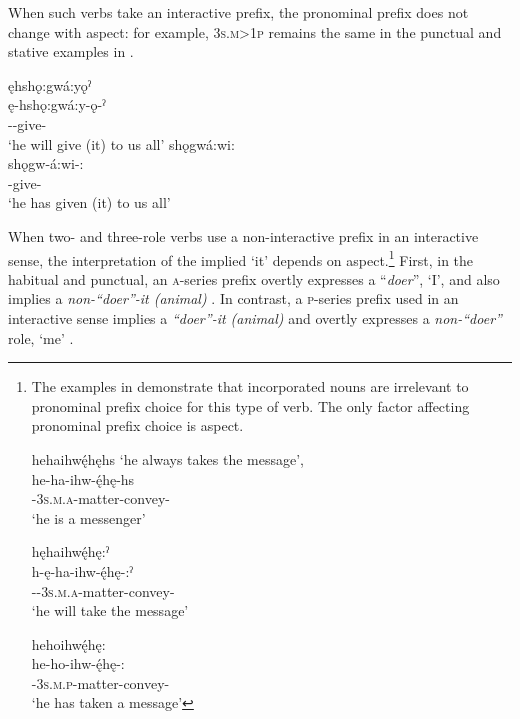When such verbs take an interactive prefix, the pronominal prefix does not change with aspect: for example,  \textsc{3s.m>1p} remains the same in the punctual and stative examples in .

\ea\label{ex:3aspswitex7}
\ea ęhshǫ:gwá:yǫˀ\\
\gll ę-hshǫ:gwá:y-ǫ-ˀ\\
 \fut--give-{\punctual}\\
\glt `he will give (it) to us all'
\ex shǫgwá:wi:\\
\gll shǫgw-á:wi-:\\
 -give-{\stative}\\
\glt `he has given (it) to us all'
\z
\z

When two- and three-role verbs use a non-interactive prefix in an interactive sense, the interpretation of the implied ‘it’ depends on aspect.\footnote{The examples in  demonstrate that incorporated nouns are irrelevant to pronominal prefix choice for this type of verb. The only factor affecting pronominal prefix choice is aspect.

\ea\label{ex:3aspswitex9} 
\ea hehaihwę́hęhs ‘he always takes the message’,\\
\gll he-ha-ihw-ę́hę-hs\\
 {\translocative}-\textsc{3s.m.a}-matter-convey-{\habitual}\\
\glt `he is a messenger'

\ex hęhaihwę́hę:ˀ\\
\gll h-ę-ha-ihw-ę́hę-:ˀ\\
 {\translocative}-{\future}-\textsc{3s.m.a}-matter-convey-{\punctual}\\
\glt ‘he will take the message’

\ex hehoihwę́hę:\\
\gll he-ho-ihw-ę́hę-:\\
{\translocative}-\textsc{3s.m.p}-matter-convey-{\stative}\\
\glt ‘he has taken a message’

\z
\z} First, in the habitual and punctual, an \textsc{a}-series prefix  overtly expresses a “\emph{doer}”, ‘I’,  and also implies a \emph{non-“doer”-it (animal)} . In contrast, a \textsc{p}-series prefix used in an interactive sense implies a \emph{“doer”-it (animal)} and overtly expresses a \emph{non-“doer”} role, ‘me’ . 

